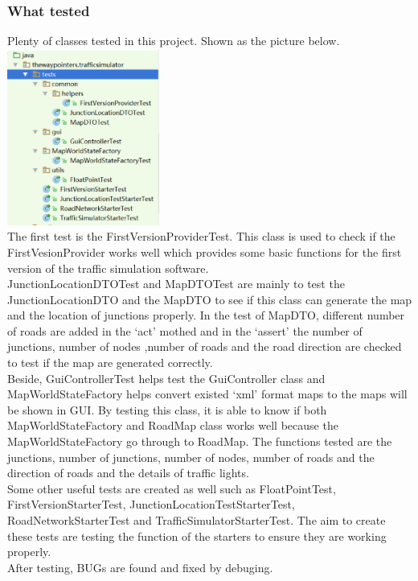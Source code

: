 \documentclass[a4paper,12pt]{article}
\begin{document}
\subsubsection{What tested}
Plenty of classes tested in this project. Shown as the picture below.\\
\includegraphics[width=5cm]{testclass.eps}\\
The first test is the FirstVersionProviderTest. This class is used to check if the FirstVesionProvider works well which provides some basic functions for the first version of the traffic simulation software. \\
JunctionLocationDTOTest and MapDTOTest are mainly to test the JunctionLocationDTO and the MapDTO to see if this class can generate the map and the location of junctions properly.
In the test of MapDTO, different number of roads are added in the ‘act’ mothed and in the ‘assert’ the number of junctions, number of nodes ,number of roads and the road direction are checked to test if the map are generated correctly.\\
Beside, GuiControllerTest helps test the GuiController class and MapWorldStateFactory helps convert existed ‘xml’ format maps to the maps will be shown in GUI. By testing this class, it is able to know if both MapWorldStateFactory and RoadMap class works well because the MapWorldStateFactory go through to RoadMap. The functions tested are the junctions, number of junctions, number of nodes, number of roads and the direction of roads and the details of traffic lights.\\
Some other useful tests are created as well such as FloatPointTest, FirstVersionStarterTest, JunctionLocationTestStarterTest, RoadNetworkStarterTest and TrafficSimulatorStarterTest. The aim to create these tests are testing the function of the starters to ensure they are working properly.\\
After testing, BUGs are found and fixed by debuging.\\
\end{document}
